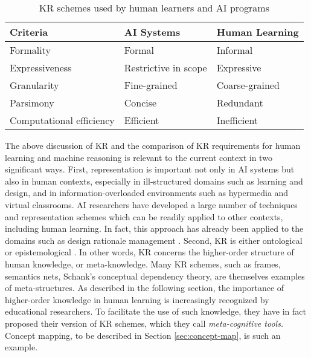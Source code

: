 \small
\begin{table}[hbt]
  \caption{KR schemes used by human learners and AI programs}
  \begin{center}
    \begin{tabular} {||l|p{1.8in}|p{1.8in}||} \hline   
      {\bf Criteria} & {\bf AI Systems} & {\bf Human Learning} \\
      \hline \hline
      
      Formality & Formal & Informal \\ \hline
      
      Expressiveness & Restrictive in scope & Expressive \\ \hline
      
      Granularity & Fine-grained & Coarse-grained \\ \hline
      
      Parsimony & Concise & Redundant \\ \hline
      
      Computational efficiency & Efficient & Inefficient \\ \hline
    \end{tabular}
   \end{center}
    \label{tab:kr-schemes}
\end{table}
\normalsize
{}

The above discussion of KR and the comparison of KR requirements for human
learning and machine reasoning is relevant to the current context in two
significant ways. First, representation is important not only in AI systems
but also in human contexts, especially in ill-structured domains such as
learning and design, and in information-overloaded environments such as
hypermedia and virtual classrooms. AI researchers have developed a large
number of techniques and representation schemes which can be readily
applied to other contexts, including human learning. In fact, this approach
has already been applied to the domains such as design rationale management
\cite{Lee91What,Conklin91Process}. Second, KR is either ontological or
epistemological \cite{Swaminathan90}. In other words, KR concerns the
higher-order structure of human knowledge, or meta-knowledge.  Many KR
schemes, such as frames, semantics nets, Schank's conceptual dependency
theory, are themselves examples of meta-structures.  As described in the
following section, the importance of higher-order knowledge in human
learning is increasingly recognized by educational researchers. To
facilitate the use of such knowledge, they have in fact proposed their
version of KR schemes, which they call {\it meta-cognitive tools.\/}
Concept mapping, to be described in Section \ref{sec:concept-map}, is such
an example.


